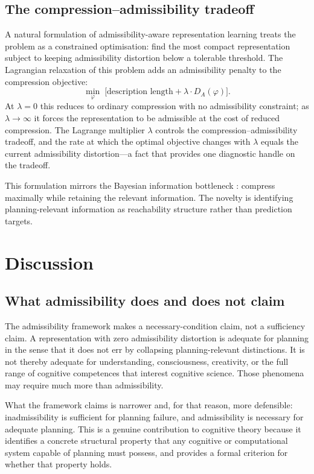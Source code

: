 \documentclass[11pt,a4paper]{article}
\begin{document}
\subsection{The compression--admissibility tradeoff}

A natural formulation of admissibility-aware representation learning treats the
problem as a constrained optimisation: find the most compact representation
subject to keeping admissibility distortion below a tolerable threshold. The
Lagrangian relaxation of this problem adds an admissibility penalty to the
compression objective:
\[
  \min_\varphi \;\big[\text{description length} + \lambda \cdot D_A(\varphi)\big].
\]
At $\lambda = 0$ this reduces to ordinary compression with no admissibility
constraint; as $\lambda \to \infty$ it forces the representation to be
admissible at the cost of reduced compression. The Lagrange multiplier $\lambda$
controls the compression--admissibility tradeoff, and the rate at which the
optimal objective changes with $\lambda$ equals the current admissibility
distortion---a fact that provides one diagnostic handle on the tradeoff.

This formulation mirrors the Bayesian information bottleneck
\citep{jaynes2003probability,tishby1999information}: compress maximally while
retaining the relevant information. The novelty is identifying planning-relevant
information as reachability structure rather than prediction targets.

\section{Discussion}

\subsection{What admissibility does and does not claim}

The admissibility framework makes a necessary-condition claim, not a
sufficiency claim. A representation with zero admissibility distortion is
adequate for planning in the sense that it does not err by collapsing
planning-relevant distinctions. It is not thereby adequate for understanding,
consciousness, creativity, or the full range of cognitive competences that
interest cognitive science. Those phenomena may require much more than
admissibility.

What the framework claims is narrower and, for that reason, more defensible:
inadmissibility is sufficient for planning failure, and admissibility is necessary
for adequate planning. This is a genuine contribution to cognitive theory
because it identifies a concrete structural property that any cognitive or
computational system capable of planning must possess, and provides a formal
criterion for whether that property holds.
\end{document}
